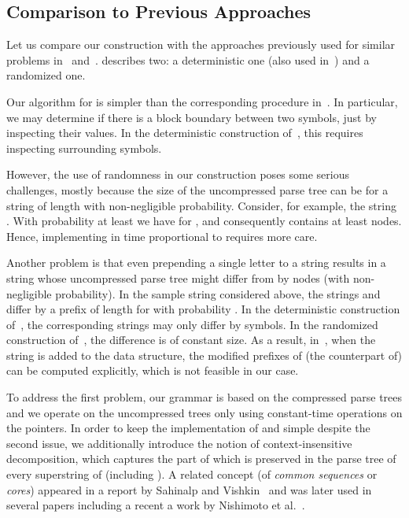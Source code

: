 \documentclass[a4paper]{article}
\theoremstyle{remark}
\begin{document}
\subsection{Comparison to Previous Approaches}\label{sec:comp}

Let us compare our construction with the approaches previously used for similar problems in~\cite{Mehlhorn} and~\cite{Alstrup}.
\cite{Mehlhorn} describes two: a deterministic one (also used in~\cite{Alstrup}) and a randomized one.

Our algorithm for  is simpler than the corresponding procedure in~\cite{Mehlhorn}.
In particular, we may determine if there is a block boundary between two symbols, just by inspecting their values.
In the deterministic construction of~\cite{Mehlhorn}, this requires inspecting  surrounding symbols.

However, the use of randomness in our construction poses some serious challenges,
mostly because the size of the uncompressed parse tree  can be  for a string  of length  with non-negligible probability.
Consider, for example, the string . With probability at least  we have 
for , and consequently  contains at least  nodes. Hence, implementing 
in time proportional to  requires more care.

Another problem is that even prepending a single letter  to a string  results in a string  
whose uncompressed parse tree  might differ from  by  nodes (with non-negligible probability).
In the sample string considered above, the strings  and 
differ by a prefix of length  for  with probability .
In the deterministic construction of~\cite{Mehlhorn}, the corresponding strings may only differ by  symbols.
In the randomized construction of~\cite{Mehlhorn}, the difference is of constant size.
As a result, in~\cite{Mehlhorn,Alstrup}, when the string  is added to the data structure, the modified prefixes of (the counterpart of)  can be computed explicitly, which is not feasible in our case. 

To address the first problem, our grammar is based on the compressed parse trees  and we operate on the uncompressed trees 
only using constant-time operations on the pointers. 
In order to keep the implementation of  and  simple despite the second issue,
we additionally introduce the notion of context-insensitive decomposition, which captures the part of  which is preserved in the parse tree of every superstring of  (including ).
A related concept (of \emph{common sequences} or \emph{cores}) appeared in a report by Sahinalp and Vishkin~\cite{SV1995} and was later used in several
papers including a recent a work by Nishimoto et al.~\cite{DBLP:journals/corr/NishimotoIIBT15}.
\end{document}
